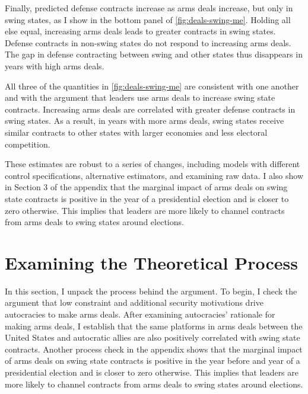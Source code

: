 \documentclass[12pt]{article}
\begin{document}
Finally, predicted defense contracts increase as arms deals increase, but only in swing states, as I show in the bottom panel of \autoref{fig:deals-swing-me}. 
Holding all else equal, increasing arms deals leads to greater contracts in swing states. 
Defense contracts in non-swing states do not respond to increasing arms deals.
The gap in defense contracting between swing and other states thus disappears in years with high arms deals. 


All three of the quantities in  \autoref{fig:deals-swing-me} are consistent with one another and with the argument that leaders use arms deals to increase swing state contracts. 
Increasing arms deals are correlated with greater defense contracts in swing states. 
As a result, in years with more arms deals, swing states receive similar contracts to other states with larger economies and less electoral competition.


These estimates are robust to a series of changes, including models with different control specifications, alternative estimators, and examining raw data.
I also show in Section 3 of the appendix that the marginal impact of arms deals on swing state contracts is positive in the year of a presidential election and is closer to zero otherwise.
This implies that leaders are more likely to channel contracts from arms deals to swing states around elections. 


\section{Examining the Theoretical Process}


In this section, I unpack the process behind the argument.  
To begin, I check the argument that low constraint and additional security motivations drive autocracies to make arms deals.
After examining autocracies' rationale for making arms deals, I establish that the same platforms in arms deals between the United States and autocratic allies are also positively correlated with swing state contracts.
Another process check in the appendix shows that the marginal impact of arms deals on swing state contracts is positive in the year before and year of a presidential election and is closer to zero otherwise.
This implies that leaders are more likely to channel contracts from arms deals to swing states around elections. 
\end{document}
